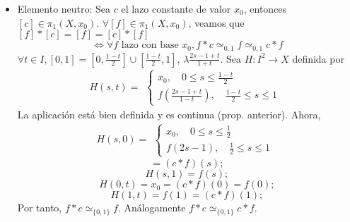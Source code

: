 \begin{dem}
\begin{itemize}
  \item Elemento neutro: Sea $c$ el lazo constante de valor $x_{0}$, entonces $[c] \in \pi_{1}(X, x_{0})$. $\forall [f] \in \pi_{1}(X, x_{0})$, veamos que $[f] * [c] = [f]  = [c] * [f]$
    \[
      \Leftrightarrow \forall f \text{ lazo con base } x_{0}, f * c \simeq_{0, 1} f \simeq_{0, 1} c * f
    \]
    $\forall t \in I, [0, 1] = [0, \frac{1 - t}{2}] \cup [\frac{1 - t}{2}, 1]$, $\lambda  \frac{2s - 1 + t}{1 + t}$. Sea $H : I^{2} \to X$ definida por 
    \[ 
      H(s,t) =
      \begin{aligned}
        \begin{cases}
          x_{0}, \quad 0 \leq s \leq \frac{1 - t}{2} \\
          f(\frac{2s - 1 + t}{1 - t}), \quad \frac{1 - t}{2} \leq s \leq 1
        \end{cases}
      \end{aligned} 
    \] 
    La aplicación está bien definida y es continua (prop. anterior). Ahora,
    \[ 
      H(s,0) =
      \begin{aligned}
        \begin{cases}
          x_{0}, \quad 0 \leq s \leq \frac{1}{2} \\
          f(2s - 1), \quad \frac{1}{2} \leq s \leq 1
        \end{cases}
      \end{aligned} 
    \] 
    \[ 
      = (c * f)(s) ;
    \] 
    \[ 
      H(s,1) = f(s);
    \] 
    \[ 
      H(0,t) = x_{0} = (c * f)(0) = f(0);
    \] 
    \[ 
      H(1, t) = f(1) = (c * f)(1);
    \] 
    Por tanto, $f * c \simeq_{\{ 0,1 \}}f$. Análogamente $f * c \simeq_{\{ 0,1 \}} c * f$.
    

\end{itemize}
\end{dem}
